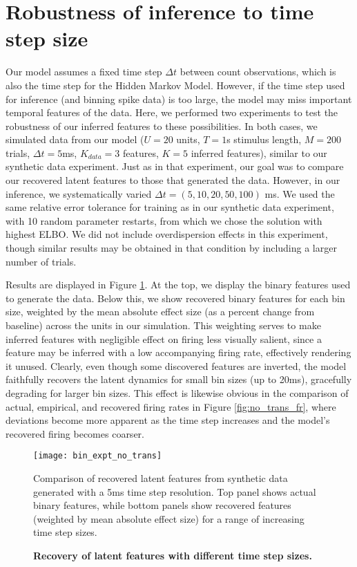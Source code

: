 \documentclass[10pt,letterpaper]{article}
\begin{document}
\section*{Robustness of inference to time step size}
Our model assumes a fixed time step $\Delta t$ between count observations, which is also the time step for the Hidden Markov Model. However, if the time step used for inference (and binning spike data) is too large, the model may miss important temporal features of the data. Here, we performed two experiments to test the robustness of our inferred features to these possibilities. In both cases, we simulated data from our model ($U=20$ units, $T=1$s stimulus length, $M=200$ trials, $\Delta t = 5$ms, $K_{data} = 3$ features, $K = 5$ inferred features), similar to our synthetic data experiment. Just as in that experiment, our goal was to compare our recovered latent features to those that generated the data. However, in our inference, we systematically varied $\Delta t = (5, 10, 20, 50, 100)$ ms. We used the same relative error tolerance for training as in our synthetic data experiment, with 10 random parameter restarts, from which we chose the solution with highest ELBO. We did not include overdispersion effects in this experiment, though similar results may be obtained in that condition by including a larger number of trials.

Results are displayed in Figure \ref{fig:no_trans}. At the top, we display the binary features used to generate the data. Below this, we show recovered binary features for each bin size, weighted by the mean absolute effect size (as a percent change from baseline) across the units in our simulation. This weighting serves to make inferred features with negligible effect on firing less visually salient, since a feature may be inferred with a low accompanying firing rate, effectively rendering it unused. Clearly, even though some discovered features are inverted, the model faithfully recovers the latent dynamics for small bin sizes (up to 20ms), gracefully degrading for larger bin sizes. This effect is likewise obvious in the comparison of actual, empirical, and recovered firing rates in Figure \ref{fig:no_trans_fr}, where deviations become more apparent as the time step increases and the model's recovered firing becomes coarser.


\begin{figure}[!ht]
    \texttt{[image: bin\_expt\_no\_trans]}
	\caption{\bf Recovery of latent features with different time step sizes.}
    Comparison of recovered latent features from synthetic data generated with a 5ms time step resolution. Top panel shows actual binary features, while bottom panels show recovered features (weighted by mean absolute effect size) for a range of increasing time step sizes.
	\label{fig:no_trans}
\end{figure}
\end{document}
